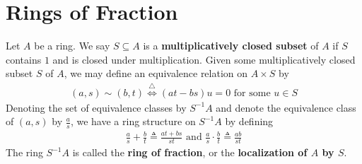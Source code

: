 \documentclass{report}
\begin{document}
\section{Rings of Fraction}
Let $A$ be a ring. We say  $S\subseteq A$ is a \textbf{multiplicatively closed subset} of $A$ if  $S$ contains $1$ and is closed under multiplication. Given some multiplicatively closed subset $S$ of $A$, we may define an equivalence relation on  $A \times S$ by 
\begin{align*}
  (a,s)\sim  (b,t) \overset{\triangle}{\iff } (at-bs)u=0\text{ for some }u \in S
\end{align*}
Denoting the set of equivalence classes by $S^{-1}A$ and denote the equivalence class of $(a,s)$ by $\frac{a}{s}$, we have a ring structure on $S^{-1}A$ by defining 
\begin{align*}
 \frac{a}{s}+ \frac{b}{t}\triangleq \frac{at+bs}{st} \text{ and } \frac{a}{s}\cdot \frac{b}{t}\triangleq \frac{ab}{st}
\end{align*}
The ring $S^{-1}A$ is called the \textbf{ring of fraction}, or the \textbf{localization of $A$ by  $S$}. 
\end{document}

